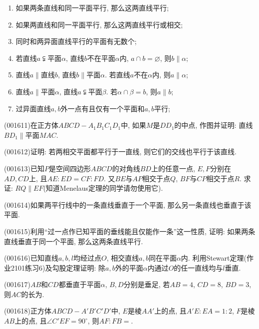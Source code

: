 \begin{enumerate}[\blank{30}(1)]
\item 如果两条直线和同一平面平行, 那么这两直线平行;\\ 
\item 如果两直线和同一平面平行, 那么这两直线平行或相交;\\ 
\item 同时和两异面直线平行的平面有无数个;\\ 
\item 若直线$a\subsetneqq$平面$\alpha$, 直线$b$不在平面$\alpha$内, $a\cap b=\varnothing$, 则$b \parallel \alpha$;\\ 
\item 直线$a\parallel$直线$b$, 直线$b\parallel$平面$\alpha$. 若直线$a$不在$\alpha$内, 则$a\parallel \alpha$;\\ 
\item 直线$a\parallel$平面$\alpha$, 直线$a\subsetneqq$平面$\beta$. 若$\alpha\cap\beta=b$, 则$a\parallel b$;\\ 
\item 过异面直线$a,b$外一点有且仅有一个平面和$a,b$平行;\\ 
\end{enumerate}
\item (001611)在正方体$ABCD-A_1B_1C_1D_1$中, 如果$M$是$DD_1$的中点, 作图并证明: 直线$BD_1\parallel$平面$MAC$.
\item (001612)证明: 若两相交平面都平行于一直线, 则它们的交线也平行于该直线.
\item (001613)已知$P$是空间四边形$ABCD$的对角线$BD$上的任意一点, $E,F$分别在$AD,CD$上, 且$AE:ED=CF:FD$. 又$BE$与$AP$相交于点$Q$, $BF$与$CP$相交于点$R$. 求证: $RQ\parallel EF$(知道{\rm Menelaus}定理的同学请勿使用它).
\item (001614)如果两平行线中的一条直线垂直于一个平面, 那么另一条直线也垂直于该平面.
\item (001615)利用``过一点作已知平面的垂线能且仅能作一条''这一性质, 证明: 如果两条直线垂直于同一个平面, 那么这两条直线平行.
\item (001616)已知直线$a,b,l$均经过点$O$, 相交直线$a,b$同在平面$\alpha$内. 利用{\rm Stewart}定理(作业2101练习6)及勾股定理证明: 除$a,b$外的平面$\alpha$内通过$O$的任一直线均与$l$垂直.
\item (001617)$AB$和$CD$都垂直于平面$\alpha$, $B,D$分别是垂足, 若$AB=4$, $CD=8$, $BD=3$, 则$AC$的长为.
\item (001618)正方体$ABCD-A'B'C'D'$中, $E$是棱$AA'$上的点, 且$A'E:EA=1:2$, $F$是棱$AB$上的点, 且$\angle C'EF=90^\circ$, 则$AF:FB=$.
